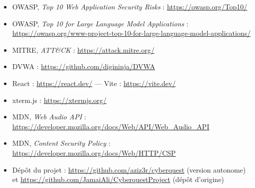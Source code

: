 \documentclass[11pt,a4paper]{report}
\begin{document}
\begin{itemize}
  \item OWASP, \emph{Top 10 Web Application Security Risks} : \url{https://owasp.org/Top10/}
  \item OWASP, \emph{Top 10 for Large Language Model Applications} :
        \url{https://owasp.org/www-project-top-10-for-large-language-model-applications/}
  \item MITRE, \emph{ATT\&CK} : \url{https://attack.mitre.org/}
  \item DVWA : \url{https://github.com/digininja/DVWA}
  \item React : \url{https://react.dev/} --- Vite : \url{https://vite.dev/}
  \item xterm.js : \url{https://xtermjs.org/}
  \item MDN, \emph{Web Audio API} :
        \url{https://developer.mozilla.org/docs/Web/API/Web_Audio_API}
  \item MDN, \emph{Content Security Policy} :
        \url{https://developer.mozilla.org/docs/Web/HTTP/CSP}
  \item D\'ep\^ot du projet : \url{https://github.com/aziz3r/cyberquest} (version
        autonome) et \url{https://github.com/JamaiAli/CyberquestProject} (d\'ep\^ot d'origine)
\end{itemize}
\end{document}
